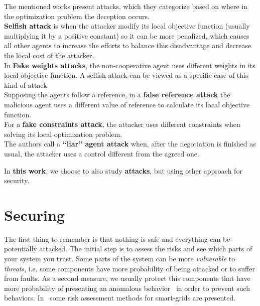 \documentclass[../main.tex]{subfiles}
\begin{document}
The mentioned works present \fdi{} attacks, which they categorize based on where in the optimization problem the deception occurs.
\\\textbf{Selfish attack} is when the attacker modify its local objective function (usually multiplying it by a positive constant) so it can be more penalized, which causes all other agents to increase the efforts to balance this disadvantage and decrease the local cost of the attacker.
\\In \textbf{Fake weights attacks}, the non-cooperative agent uses different weights in its local objective function. A selfish attack can be viewed as a specific case of this kind of attack.
\\Supposing the agents follow a reference, in a \textbf{false reference attack} the malicious agent uses a different value of reference to calculate its local objective function.
\\For a \textbf{fake constraints attack}, the attacker uses different constraints when solving its local optimization problem.
\\The authors call a \textbf{``liar'' agent attack} when, after the negotiation is finished as usual, the attacker uses a control different from the agreed one.

In \textbf{this work}, we choose to also study \textbf{\fdi{} attacks}, but using other approach for security.
\section{Securing \cps{}}\label{sec:maintaining_security}
The first thing to remember is that nothing is safe and everything can be potentially attacked.
The initial step is to assess the risks and see which parts of your system you trust.
Some parts of the system can be more \emph{vulnerable} to \emph{threats}, i.e. some components have more probability of being attacked or to suffer from faults.
As a second measure, we usually protect this components that have more probability of presenting an anomalous behavior~\cite{Bishop2005} in order to prevent such behaviors.
In~\cite{WangLu2013} some risk assessment methods for smart-grids are presented.
\end{document}
